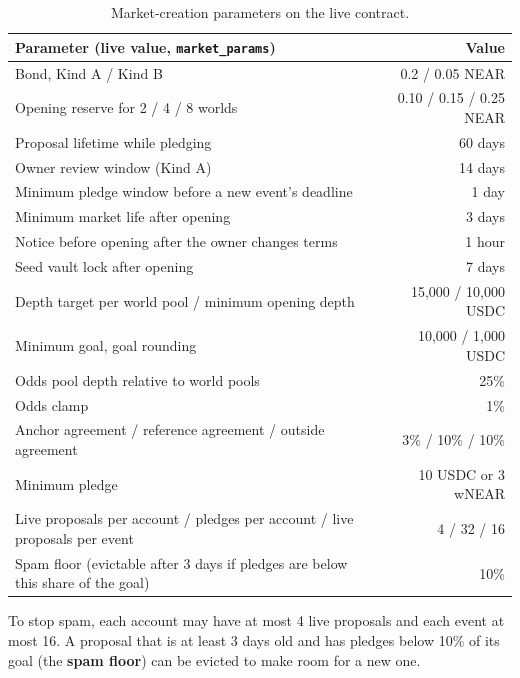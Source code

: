 \documentclass[11pt,a4paper]{article}
\newcommand{\code}[1]{\texttt{\small #1}}
\begin{document}
\begin{table}[t]
\centering
\small
\begin{tabularx}{\linewidth}{@{}Xr@{}}
\toprule
\textbf{Parameter (live value, \code{market\_params})} & \textbf{Value} \\
\midrule
Bond, Kind A / Kind B & 0.2 / 0.05 NEAR \\
Opening reserve for 2 / 4 / 8 worlds & 0.10 / 0.15 / 0.25 NEAR \\
Proposal lifetime while pledging & 60 days \\
Owner review window (Kind A) & 14 days \\
Minimum pledge window before a new event's deadline & 1 day \\
Minimum market life after opening & 3 days \\
Notice before opening after the owner changes terms & 1 hour \\
Seed vault lock after opening & 7 days \\
Depth target per world pool / minimum opening depth & 15,000 / 10,000 USDC \\
Minimum goal, goal rounding & 10,000 / 1,000 USDC \\
Odds pool depth relative to world pools & 25\% \\
Odds clamp & 1\% \\
Anchor agreement / reference agreement / outside agreement & 3\% / 10\% / 10\% \\
Minimum pledge & 10 USDC or 3 wNEAR \\
Live proposals per account / pledges per account / live proposals per event & 4 / 32 / 16 \\
Spam floor (evictable after 3 days if pledges are below this share of the goal) & 10\% \\
\bottomrule
\end{tabularx}
\caption{Market-creation parameters on the live contract.}
\label{tab:catalog}
\end{table}

To stop spam, each account may have at most 4 live proposals and each event at most 16. A proposal that is at least 3
days old and has pledges below 10\% of its goal (the \textbf{spam floor}) can be evicted to make room for a new one.
\end{document}
